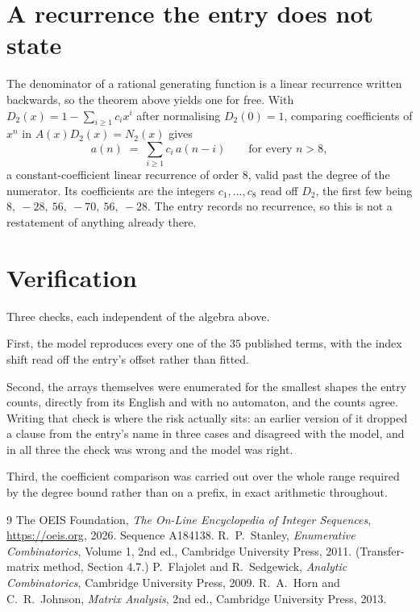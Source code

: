 \documentclass[11pt,a4paper]{article}
\theoremstyle{plain}
\theoremstyle{definition}
\begin{document}
\section{A recurrence the entry does not state}

The denominator of a rational generating function is a linear recurrence written backwards, so
the theorem above yields one for free. With $D_2(x)=1-\sum_{i\ge1}c_ix^i$ after normalising
$D_2(0)=1$, comparing coefficients of $x^n$ in $A(x)D_2(x)=N_2(x)$ gives
\[
a(n)\;=\;\sum_{i\ge1}c_i\,a(n-i)\qquad\text{for every }n>8,
\]
a constant-coefficient linear recurrence of order $8$, valid past the degree of the
numerator. Its coefficients are the integers $c_1,\dots,c_{8}$ read off $D_2$, the first few being $8,\ -28,\ 56,\ -70,\ 56,\ -28$. The entry records no recurrence, so this is not a restatement of anything
already there.

\section{Verification}

Three checks, each independent of the algebra above.

First, the model reproduces every one of the $35$ published terms, with the index shift
read off the entry's offset rather than fitted.

Second, the arrays themselves were enumerated for the smallest shapes the entry counts,
directly from its English and with no automaton, and the counts agree. Writing that check is
where the risk actually sits: an earlier version of it dropped a clause from the entry's name
in three cases and disagreed with the model, and in all three the check was wrong and the model
was right.

Third, the coefficient comparison was carried out over the whole range required by the degree
bound rather than on a prefix, in exact arithmetic throughout.

\begin{thebibliography}{9}
 The OEIS Foundation, \emph{The On-Line Encyclopedia of Integer
Sequences}, \url{https://oeis.org}, 2026. Sequence A184138.
 R.~P.~Stanley, \emph{Enumerative Combinatorics}, Volume 1, 2nd ed.,
Cambridge University Press, 2011. (Transfer-matrix method, Section 4.7.)
 P.~Flajolet and R.~Sedgewick, \emph{Analytic Combinatorics}, Cambridge
University Press, 2009.
 R.~A.~Horn and C.~R.~Johnson, \emph{Matrix Analysis}, 2nd ed., Cambridge
University Press, 2013.
\end{thebibliography}
\end{document}
